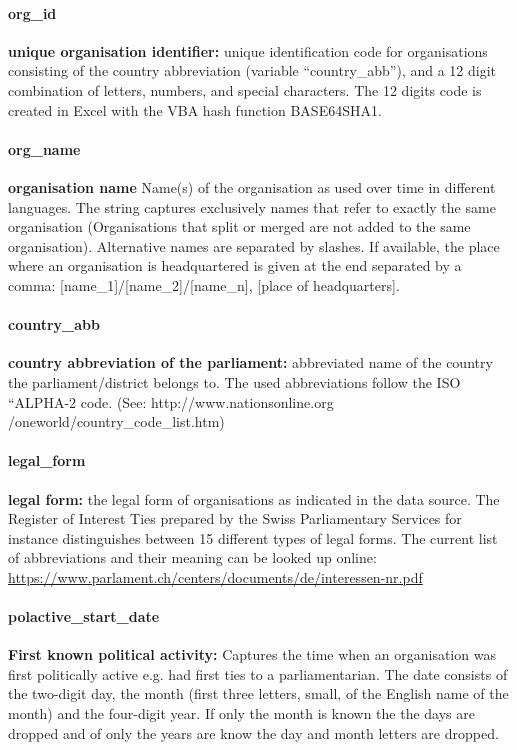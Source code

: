 \documentclass{article}
\begin{document}
\paragraph{org\_id}
\textbf{unique organisation identifier:} unique identification code for organisations consisting of the country abbreviation (variable ``country\_abb''), and a 12 digit combination of letters, numbers, and special characters. The 12 digits code is created in Excel with the VBA hash function BASE64SHA1.
       
\paragraph{org\_name}
\textbf{organisation name} Name(s) of the organisation as used over time in different languages. The string captures exclusively names that refer to exactly the same organisation (Organisations that split or merged are not added to the same organisation). Alternative names are separated by slashes. If available, the place where an organisation is headquartered is given at the end separated by a comma: [name_1]/[name_2]/[name_n], [place of headquarters]. 


\paragraph{country\_abb}
\textbf{country abbreviation of the parliament:} abbreviated name of the country the parliament/district belongs to. The used abbreviations follow the ISO ``ALPHA-2 code. (See: http://www.nationsonline.org /oneworld/country\_code\_list.htm)

\paragraph{legal\_form}
\textbf{legal form:} the legal form of organisations as indicated in the data source. The Register of Interest Ties prepared by the Swiss Parliamentary Services for instance distinguishes between 15 different types of legal forms. The current list of abbreviations and their meaning can be looked up online: \url{https://www.parlament.ch/centers/documents/de/interessen-nr.pdf}

\paragraph{polactive\_start\_date}
 \textbf{First known political activity:} Captures the time when an organisation was first politically active e.g. had first ties to a parliamentarian. The date consists of the two-digit day, the month (first three letters, small, of the English name of the month) and the four-digit year. If only the month is known the the days are dropped and of only the years are know the day and month letters are dropped.
\end{document}
